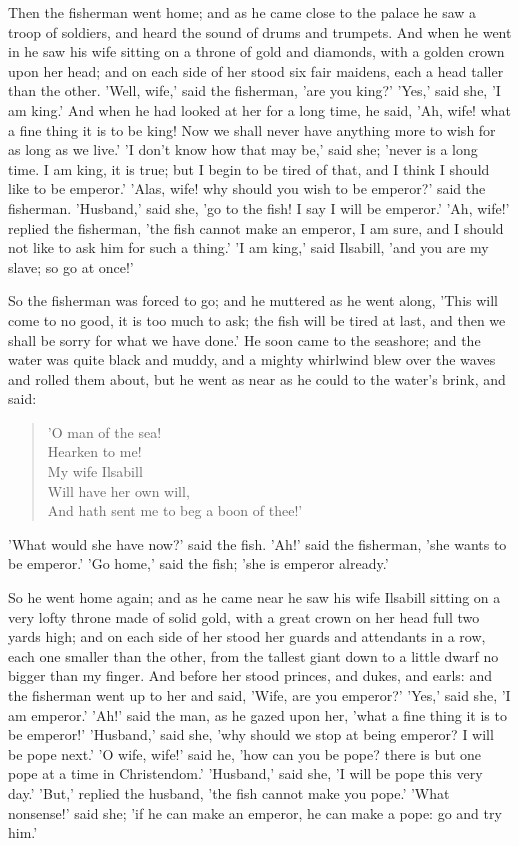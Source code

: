 \documentclass[12pt]{book}
\begin{document}
Then the fisherman went home; and as he came close to the palace he
saw a troop of soldiers, and heard the sound of drums and trumpets.
And when he went in he saw his wife sitting on a throne of gold and
diamonds, with a golden crown upon her head; and on each side of her
stood six fair maidens, each a head taller than the other. 'Well,
wife,' said the fisherman, 'are you king?' 'Yes,' said she, 'I am
king.' And when he had looked at her for a long time, he said, 'Ah,
wife! what a fine thing it is to be king! Now we shall never have
anything more to wish for as long as we live.' 'I don't know how that
may be,' said she; 'never is a long time. I am king, it is true; but I
begin to be tired of that, and I think I should like to be emperor.'
'Alas, wife! why should you wish to be emperor?' said the fisherman.
'Husband,' said she, 'go to the fish! I say I will be emperor.' 'Ah,
wife!' replied the fisherman, 'the fish cannot make an emperor, I am
sure, and I should not like to ask him for such a thing.' 'I am king,'
said Ilsabill, 'and you are my slave; so go at once!'

So the fisherman was forced to go; and he muttered as he went along,
'This will come to no good, it is too much to ask; the fish will be
tired at last, and then we shall be sorry for what we have done.' He
soon came to the seashore; and the water was quite black and muddy,
and a mighty whirlwind blew over the waves and rolled them about, but
he went as near as he could to the water's brink, and said:

\begin{verse}
 'O man of the sea!\\
  Hearken to me!\\
  My wife Ilsabill\\
  Will have her own will,\\
  And hath sent me to beg a boon of thee!'
\end{verse}

'What would she have now?' said the fish. 'Ah!' said the fisherman,
'she wants to be emperor.' 'Go home,' said the fish; 'she is emperor
already.'

So he went home again; and as he came near he saw his wife Ilsabill
sitting on a very lofty throne made of solid gold, with a great crown
on her head full two yards high; and on each side of her stood her
guards and attendants in a row, each one smaller than the other, from
the tallest giant down to a little dwarf no bigger than my finger. And
before her stood princes, and dukes, and earls: and the fisherman went
up to her and said, 'Wife, are you emperor?' 'Yes,' said she, 'I am
emperor.' 'Ah!' said the man, as he gazed upon her, 'what a fine thing
it is to be emperor!' 'Husband,' said she, 'why should we stop at
being emperor? I will be pope next.' 'O wife, wife!' said he, 'how can
you be pope? there is but one pope at a time in Christendom.'
'Husband,' said she, 'I will be pope this very day.' 'But,' replied
the husband, 'the fish cannot make you pope.' 'What nonsense!' said
she; 'if he can make an emperor, he can make a pope: go and try him.'
\end{document}
